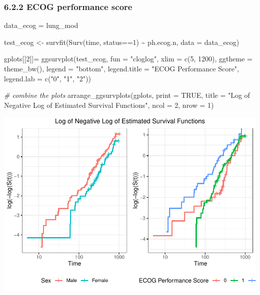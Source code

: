 \documentclass[
]{article}
\newenvironment{Shaded}{\begin{snugshade}}{\end{snugshade}}
\newcommand{\AttributeTok}[1]{\textcolor[rgb]{0.77,0.63,0.00}{#1}}
\newcommand{\CommentTok}[1]{\textcolor[rgb]{0.56,0.35,0.01}{\textit{#1}}}
\newcommand{\ConstantTok}[1]{\textcolor[rgb]{0.00,0.00,0.00}{#1}}
\newcommand{\DecValTok}[1]{\textcolor[rgb]{0.00,0.00,0.81}{#1}}
\newcommand{\FunctionTok}[1]{\textcolor[rgb]{0.00,0.00,0.00}{#1}}
\newcommand{\NormalTok}[1]{#1}
\newcommand{\OtherTok}[1]{\textcolor[rgb]{0.56,0.35,0.01}{#1}}
\newcommand{\SpecialCharTok}[1]{\textcolor[rgb]{0.00,0.00,0.00}{#1}}
\newcommand{\StringTok}[1]{\textcolor[rgb]{0.31,0.60,0.02}{#1}}
\begin{document}
\hypertarget{ecog-performance-score-1}{%
\subsubsection{6.2.2 ECOG performance
score}\label{ecog-performance-score-1}}

\begin{Shaded}
\begin{Highlighting}[]
\NormalTok{data\_ecog }\OtherTok{=}\NormalTok{ lung\_mod }

\NormalTok{test\_ecog }\OtherTok{\textless{}{-}} \FunctionTok{survfit}\NormalTok{(}\FunctionTok{Surv}\NormalTok{(time, status}\SpecialCharTok{==}\DecValTok{1}\NormalTok{) }\SpecialCharTok{\textasciitilde{}}\NormalTok{ ph.ecog.n, }\AttributeTok{data =}\NormalTok{ data\_ecog)}

\NormalTok{gplots[[}\DecValTok{2}\NormalTok{]]}\OtherTok{=} \FunctionTok{ggsurvplot}\NormalTok{(test\_ecog, }
           \AttributeTok{fun =} \StringTok{"cloglog"}\NormalTok{,}
           \AttributeTok{xlim =} \FunctionTok{c}\NormalTok{(}\DecValTok{5}\NormalTok{, }\DecValTok{1200}\NormalTok{),}
           \AttributeTok{ggtheme =} \FunctionTok{theme\_bw}\NormalTok{(), }
           \AttributeTok{legend =} \StringTok{"bottom"}\NormalTok{, }
           \AttributeTok{legend.title =} \StringTok{"ECOG Performance Score"}\NormalTok{,}
           \AttributeTok{legend.lab =} \FunctionTok{c}\NormalTok{(}\StringTok{"0"}\NormalTok{, }\StringTok{"1"}\NormalTok{, }\StringTok{"2"}\NormalTok{))}
\end{Highlighting}
\end{Shaded}

\begin{Shaded}
\begin{Highlighting}[]
\CommentTok{\# combine the plots}
\FunctionTok{arrange\_ggsurvplots}\NormalTok{(gplots, }
                    \AttributeTok{print =} \ConstantTok{TRUE}\NormalTok{,}
                    \AttributeTok{title =} \StringTok{"Log of Negative Log of Estimated Survival Functions"}\NormalTok{,}
                    \AttributeTok{ncol =} \DecValTok{2}\NormalTok{, }
                    \AttributeTok{nrow =} \DecValTok{1}\NormalTok{)}
\end{Highlighting}
\end{Shaded}

\includegraphics{final_project_files/figure-latex/unnamed-chunk-35-1.pdf}
\end{document}
